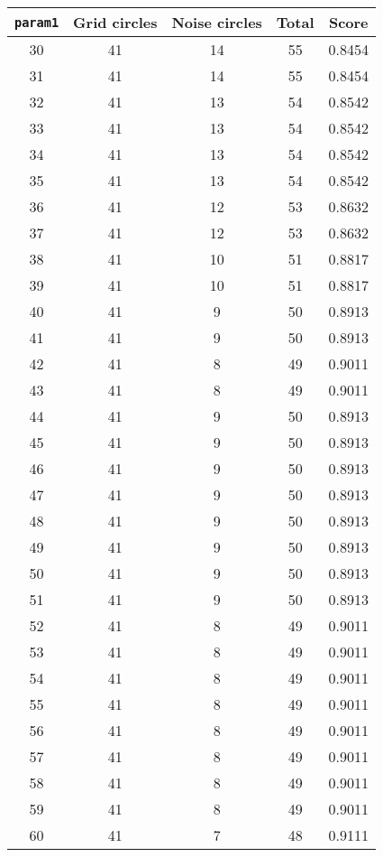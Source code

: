 \documentclass[letterpaper, 12pt]{article}
\begin{document}
\begin{longtable}{|c|c|c|c|c|}
\hline
\textbf{\texttt{param1}} & \textbf{Grid circles} & \textbf{Noise circles} & \textbf{Total} & \textbf{Score} \\
\hline
30 & 41 & 14 & 55 & 0.8454 \\
\hline
31 & 41 & 14 & 55 & 0.8454 \\
\hline
32 & 41 & 13 & 54 & 0.8542 \\
\hline
33 & 41 & 13 & 54 & 0.8542 \\
\hline
34 & 41 & 13 & 54 & 0.8542 \\
\hline
35 & 41 & 13 & 54 & 0.8542 \\
\hline
36 & 41 & 12 & 53 & 0.8632 \\
\hline
37 & 41 & 12 & 53 & 0.8632 \\
\hline
38 & 41 & 10 & 51 & 0.8817 \\
\hline
39 & 41 & 10 & 51 & 0.8817 \\
\hline
40 & 41 & 9 & 50 & 0.8913 \\
\hline
41 & 41 & 9 & 50 & 0.8913 \\
\hline
42 & 41 & 8 & 49 & 0.9011 \\
\hline
43 & 41 & 8 & 49 & 0.9011 \\
\hline
44 & 41 & 9 & 50 & 0.8913 \\
\hline
45 & 41 & 9 & 50 & 0.8913 \\
\hline
46 & 41 & 9 & 50 & 0.8913 \\
\hline
47 & 41 & 9 & 50 & 0.8913 \\
\hline
48 & 41 & 9 & 50 & 0.8913 \\
\hline
49 & 41 & 9 & 50 & 0.8913 \\
\hline
50 & 41 & 9 & 50 & 0.8913 \\
\hline
51 & 41 & 9 & 50 & 0.8913 \\
\hline
52 & 41 & 8 & 49 & 0.9011 \\
\hline
53 & 41 & 8 & 49 & 0.9011 \\
\hline
54 & 41 & 8 & 49 & 0.9011 \\
\hline
55 & 41 & 8 & 49 & 0.9011 \\
\hline
56 & 41 & 8 & 49 & 0.9011 \\
\hline
57 & 41 & 8 & 49 & 0.9011 \\
\hline
58 & 41 & 8 & 49 & 0.9011 \\
\hline
59 & 41 & 8 & 49 & 0.9011 \\
\hline
60 & 41 & 7 & 48 & 0.9111 \\
\hline

\end{longtable}
\end{document}
